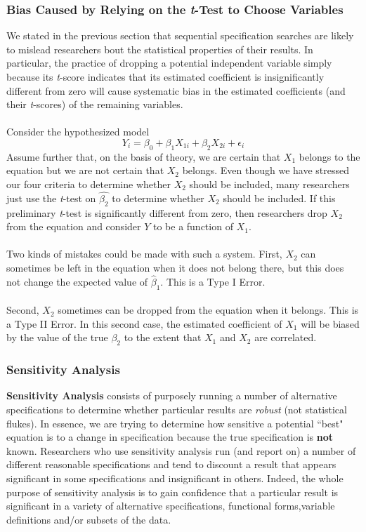 \documentclass[11pt]{article}
\begin{document}
\subsubsection{Bias Caused by Relying on the \textit{t}-Test to Choose Variables}
We stated in the previous section that sequential specification searches are likely to mislead researchers bout the statistical properties of their results. In particular, the practice of dropping a potential independent variable simply because its \textit{t}-score indicates that its estimated coefficient is insignificantly different from zero will cause systematic bias in the estimated coefficients (and their \textit{t}-scores) of the remaining variables.\\ \\
Consider the hypothesized model
\begin{equation}
\label{eg6_17}
Y_i = \beta_0 + \beta_{1}X_{1i} + \beta_{2}X_{2i} + \epsilon_i
\end{equation}
Assume further that, on the basis of theory, we are certain that $X_1$ belongs to the equation but we are not certain that $X_2$ belongs. Even though we have stressed our four criteria to determine whether $X_2$ should be included, many researchers just use the \textit{t}-test on $\hat{\beta_2}$ to determine whether $X_2$ should be included.  If this preliminary \textit{t}-test is significantly different from zero, then researchers drop $X_2$ from the equation and consider $Y$ to be a function of $X_1$.\\\\
Two kinds of mistakes could be made with such a system. First, $X_2$ can sometimes be left in the equation when it does not belong there, but this does not change the expected value of $\hat{\beta}_1$. This is a Type I Error.\\ \\
Second, $X_2$ sometimes can be dropped from the equation when it belongs. This is a Type II Error. In this second case, the estimated coefficient of $X_1$ will be biased by the value of the true $\beta_2$ to the extent that $X_1$ and $X_2$ are correlated.
\subsubsection{Sensitivity Analysis}
\textbf{Sensitivity Analysis} consists of purposely running a number of alternative specifications to determine whether particular results are \textit{robust} (not statistical flukes). In essence, we are trying to determine how sensitive a potential ``best" equation is to a change in specification because the true specification is \textbf{not} known. Researchers who use sensitivity analysis run (and report on) a number of different reasonable specifications and tend to discount a result that appears significant in some specifications and insignificant in others. Indeed, the whole purpose of sensitivity analysis is to gain confidence that a particular result is significant in a variety of alternative specifications, functional forms,variable definitions and/or subsets of the data. 
\end{document}
